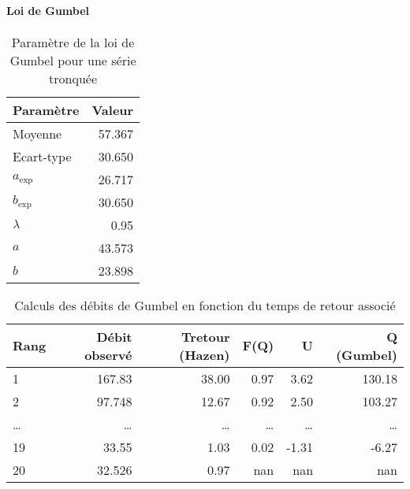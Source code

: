 \paragraph{Loi de Gumbel}
\begin{table}[H]
    \centering
    \begin{tabular}{l|r}
        \toprule
        \textbf{Paramètre} & \textbf{Valeur} \\
        \midrule
        Moyenne            & 57.367          \\
        Ecart-type         & 30.650          \\
        \midrule
        $a_\text{exp}$     & 26.717          \\
        $b_\text{exp}$     & 30.650          \\
        \midrule
        $\lambda$          & 0.95            \\
        $a$                & 43.573          \\
        $b$                & 23.898          \\
        \bottomrule
    \end{tabular}
    \caption{Paramètre de la loi de Gumbel pour une série tronquée}
    \label{tab:param_Gumbel_tronquees2}
\end{table}

\begin{table}[H]
    \centering
    \begin{tabular}{l|r|r|r|r|r}
        \toprule
        \textbf{Rang} & \textbf{Débit observé} & \textbf{Tretour (Hazen)} & \textbf{F(Q)} & \textbf{U} & \textbf{Q (Gumbel)} \\
        \midrule
        1             & 167.83                 & 38.00                    & 0.97          & 3.62       & 130.18              \\
        2             & 97.748                 & 12.67                    & 0.92          & 2.50       & 103.27              \\
        \dots         & \dots                  & \dots                    & \dots         & \dots      & \dots               \\
        19            & 33.55                  & 1.03                     & 0.02          & -1.31      & -6.27               \\
        20            & 32.526                 & 0.97                     & nan           & nan        & nan                 \\
        \bottomrule
    \end{tabular}
    \caption{Calculs des débits de Gumbel en fonction du temps de retour associé}
    \label{tab:gumbelcalcul_tronquees}
\end{table}

